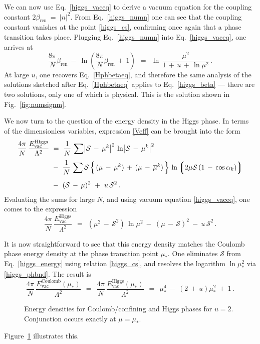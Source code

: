 \documentclass[epsfig,12pt]{article}
\def\beq{\begin{equation}}
\def\eeq{\end{equation}}
\newcommand{\cs}{{\mathcal S}}
\def\beq{\begin{equation}}
\def\eeq{\end{equation}}
\newcommand{\ov}{\overline}
\newcommand{\lgr}{\left\lgroup}
\newcommand{\rgr}{\right\rgroup}
\newcommand{\bren}{{\beta_\text{ren}}}
\begin{document}
{We can now use Eq.~\eqref{higgs_vaceq} to derive a vacuum equation
for the coupling constant $ 2\bren ~=~ |n|^2 $.
From Eq.~\eqref{higgs_numn} one can see that the coupling constant vanishes
at the point \eqref{higgs_cs}, confirming once again that a phase transition takes place.
Plugging Eq.~\eqref{higgs_numn} into Eq.~\eqref{higgs_vaceq}, one arrives at
\beq
\label{higgs_beta}
	\frac{8\pi}{N}\bren ~-~ \ln \left( \frac{8\pi}{N}\bren \,+\, 1\right) 
		~~=~~ 
	\ln\,
	\frac{\mu^2}
        {1 \,+\, u \,+\, \ln \mu^2}\,.
\eeq
At large $u$, one recovers Eq.~\eqref{Hphbetaeq}, and therefore the same analysis of the solutions
sketched after Eq.~\eqref{Hphbetaeq} applies to Eq.~\eqref{higgs_beta} --- there are two solutions,
only one of which is physical.
This is the solution shown in Fig.~\ref{fig:numsignm}.

We now turn to the question of the energy density in the Higgs phase.
In terms of the dimensionless variables, expression \eqref{Veff} can be brought into the form
\begin{align}
%
\notag
	\frac{4\pi}{N}\,\frac{E_\text{vac}^\text{Higgs}}{\Lambda^2} & ~=~ 
			\frac{1}N\, \sum \bigl| \cs \,-\, \mu^k \bigr|^2\, \ln \bigl| \cs \,-\, \mu^k \bigr|^2 
	\\[1mm]
%
	&
	~-~ \frac{1}N\, \sum \cs\, \Bigl\{\,  (\mu \,-\, \mu^k) \,+\, (\mu \,-\, \ov{\mu}{}^k) \,\Bigr\}\,
		   		   \ln \lgr 2\mu\cs\, ( 1\, -\, \cos \alpha_k ) \rgr \\[2mm]
%
\notag
	&
	~-~ ( \cs \,-\, \mu )^2 ~+~ u\, \cs^2\,.
\end{align}
Evaluating the sums for large $N$, and using vacuum equation \eqref{higgs_vaceq}, one comes to the expression
\beq
\label{higgs_energy}
	\frac{4\pi}{N}\,\frac{E_\text{vac}^\text{Higgs}}{\Lambda^2} ~~=~~
	( \mu^2 \,-\, \cs^2 )\, \ln \mu^2 ~-~ (\mu \,-\, \cs)^2 ~-~ u\, \cs^2\,.
\eeq

It is now straightforward to see that this energy density matches the Coulomb phase energy density at the
phase transition point $\mu_*$. 
One eliminates $\cs$ from Eq.~\eqref{higgs_energy} using relation \eqref{higgs_cs}, and resolves the
logarithm $ \ln \mu_*^2 $ via \eqref{higgs_phbnd}.
The result is
\beq
	\frac{4\pi}{N}\,\frac{E_\text{vac}^\text{Coulomb}(\mu_*)}{\Lambda^2} ~~=~~
	\frac{4\pi}{N}\,\frac{E_\text{vac}^\text{Higgs}(\mu_*)}{\Lambda^2} ~~=~~
	\mu_*^4 ~-~ ( 2 \,+\, u ) \mu_*^2 ~+~ 1\,.
\eeq
\begin{figure}
\epsfxsize=11cm
\centerline{}
\caption{\small 
Energy densities for Coulomb/confining and Higgs phases for $ u = 2 $.
Conjunction occurs exactly at $ \mu = \mu_* $.
}
\label{fig:higgsenergy}
\end{figure}
Figure~\ref{fig:higgsenergy} illustrates this.


}
\end{document}
